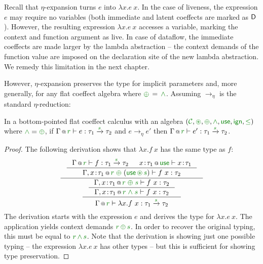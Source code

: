 Recall that $\eta$-expansion turns $e$ into $\lambda x.e~x$. In the case of liveness, the
expression $e$ may require no variables (both immediate and latent coeffects are marked as
$\textnormal{\sffamily D}$). However, the resulting expression $\lambda x.e~x$ accesses a variable,
marking the context and function argument as live. In case of dataflow, the immediate coeffects
are made larger by the lambda abstraction -- the context demands of the function value are
imposed on the declaration site of the new lambda abstraction. We remedy this limitation in
the next chapter.

However, $\eta$-expansion preserves the type for implicit parameters and, more generally,
for any flat coeffect algebra where $\cpar \,=\, \czip$. Assuming $\rightarrow_\eta$ is the
standard $\eta$-reduction:

\begin{theorem}
In a bottom-pointed flat coeffect calculus with an algebra $(\C, \cseq, \cpar, \czip, \cunit, \czero, \cleq)$
where $\czip = \cpar$, if $\coctx{\Gamma}{\cclrd{r}} \vdash e : \tau_1 \xrightarrow{\cclrd{s}} \tau_2$
and $e \rightarrow_\eta e'$ then $\coctx{\Gamma}{\cclrd{r}} \vdash e' : \tau_1 \xrightarrow{\cclrd{s}} \tau_2 $.
\end{theorem}
\begin{proof}
The following derivation shows that $\lambda x.f~x$ has the same type as $f$:
\begin{equation*}
\inference
  { \inference
    { \coctx{\Gamma}{\cclrd{r}} \vdash f : \tau_1 \xrightarrow{\cclrd{s}} \tau_2 &
      \coctx{x\!:\!\tau_1}{\cunit} \vdash x\!:\!\tau_1 }
    { \coctx{\Gamma, x\!:\!\tau_1}{\cclrd{r} \;\cpar\; (\cunit \,\cseq\, \cclrd{s}) } \vdash f~x : \tau_2 } }
  { \inference
    { \inference
      { \coctx{\Gamma, x\!:\!\tau_1}{\cclrd{r} \;\cpar\; \cclrd{s} } \vdash f~x : \tau_2 }
      { \coctx{\Gamma, x\!:\!\tau_1}{\cclrd{r} \;\czip\; \cclrd{s} } \vdash f~x : \tau_2 } }
    { \coctx{\Gamma}{ \cclrd{r} } \vdash \lambda x.f~x : \tau_1 \xrightarrow{\cclrd{s}} \tau_2 } }
\end{equation*}
%
The derivation starts with the expression $e$ and derives the type for $\lambda x.e~x$. The
application yields context demands $\cclrd{r}\,\cpar\,\cclrd{s}$. In order to recover the
original typing, this must be equal to $\cclrd{r}\,\czip\,\cclrd{s}$. Note that the derivation
is showing just one possible typing -- the expression $\lambda x.e~x$ has other types -- but
this is sufficient for showing type preservation.
\end{proof}

